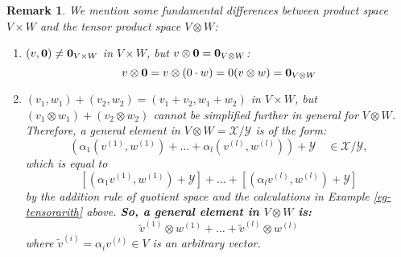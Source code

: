 \documentclass[12pt]{amsbook}
\newtheorem{remark}[theorem]{Remark}
\begin{document}
\begin{remark}
We mention some fundamental differences between product space $V \times W$ and the tensor product space $V \otimes W$:
\begin{enumerate}
    \item $(v,{\bf 0}) \neq {\bf 0}_{V\times W}$ in $V \times W$, but $v \otimes {\bf 0} = {\bf 0}_{V \otimes W}$:
    $$v \otimes {\bf 0} = v \otimes (0 \cdot w) = 0(v \otimes w) = {\bf 0}_{V \otimes W}$$
    \item  $(v_1,w_1) + (v_2,w_2) = (v_1 + v_2,w_1 + w_2)$ in $V \times W$,  but $(v_1 \otimes w_1) + (v_2 \otimes w_2)$ cannot be simplified further in  general for $V \otimes W$. Therefore, a general element in $V \otimes W = \mathcal{X}/\mathcal{Y}$ is of the form:
    $$(\alpha_1 (v^{(1)}, w^{(1)}) + \dots + \alpha_l (v^{(l)}, w^{(l)})) + \mathcal{Y} \quad \in \mathcal{X}/\mathcal{Y},$$
    which is equal to
    $$[(\alpha_1v^{(1)}, w^{(1)}) + \mathcal{Y}] + \dots + [(\alpha_lv^{(l)}, w^{(l)}) + \mathcal{Y}]$$
    by the addition rule of quotient space and the calculations in Example \ref{eg-tensorarith} above. {\bf So, a general element in $V \otimes W$ is:}
    $$\widetilde{v}^{(1)} \otimes w^{(1)} + \dots + \widetilde{v}^{(l)} \otimes w^{(l)}$$
    where $\widetilde{v}^{(i)} = \alpha_i v^{(i)} \in V$ is an arbitrary vector. 
\end{enumerate}
\end{remark}
\end{document}
